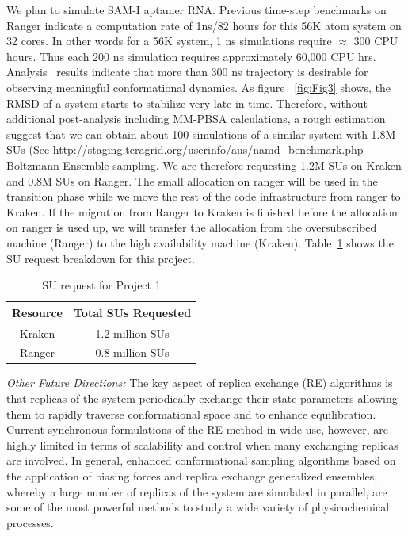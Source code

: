 \documentclass[a4paper,11pt]{article}
\newcommand{\up}{\vspace*{-1em}}
\begin{document}
We plan to simulate SAM-I aptamer RNA. Previous time-step benchmarks on Ranger indicate a computation rate of 1ns/82 hours for this 56K atom system on 32 cores. In other words for a 56K system, 1 ns simulations require $\approx$ 300 CPU hours.  Thus each 200 ns simulation requires approximately 60,000 CPU hrs.  Analysis~\cite{SAM-I-NAR2009} results indicate that more than 300 ns trajectory is desirable for observing meaningful conformational dynamics. As figure ~\ref{fig:Fig3} shows, the RMSD of a system starts to stabilize very late in time. Therefore, without additional post-analysis including MM-PBSA calculations, a rough estimation suggest that we can obtain about 100 simulations of a similar system with 1.8M SUs (See {\url{http://staging.teragrid.org/userinfo/aus/namd_benchmark.php}} Boltzmann Ensemble sampling. We are therefore requesting 1.2M SUs on Kraken and 0.8M SUs on Ranger. The small allocation on ranger will be used in the transition phase while we move the rest of the code infrastructure from ranger to Kraken. If the migration from Ranger to Kraken is finished before the allocation on ranger is used up, we will transfer the allocation from the oversubscribed machine (Ranger) to the high availability machine (Kraken). Table~\ref{table:project1} shows the SU request breakdown for this project.

\begin{table}[!h]
\begin{center}
\begin{tabular}{|c|c| }
\hline 
Resource & Total SUs Requested \\ 
\hline
Kraken   & 1.2 million SUs \\
\hline
Ranger   & 0.8 million SUs \\
\hline
\end{tabular}
\end{center}
  \caption{SU request for Project 1}\label{table:project1}
\up
\end{table}

{\it Other Future Directions:} The key aspect of replica exchange (RE) algorithms is that replicas of the system periodically exchange their state parameters allowing them to rapidly traverse conformational space and to enhance equilibration. Current synchronous formulations of the RE method in wide use, however, are highly limited in terms of scalability and control when many exchanging replicas are involved.  In general, enhanced conformational sampling algorithms based on the application of biasing forces and replica exchange generalized ensembles, whereby a large number of replicas of the system are simulated in parallel, are some of the most powerful methods to study a wide variety of physicochemical processes.
\end{document}
